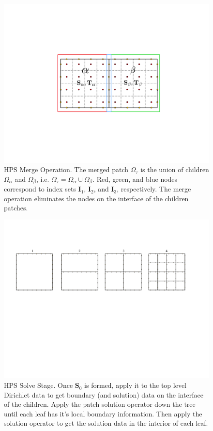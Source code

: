 \begin{figure}
    \centering
    \includegraphics[width=0.7\columnwidth]{figures/merge_figure.pdf}
    \caption{HPS Merge Operation. The merged patch $\Omega_{\tau}$ is the union of children $\Omega_{\alpha}$ and $\Omega_{\beta}$, i.e. $\Omega_{\tau} = \Omega_{\alpha} \cup \Omega_{\beta}$. Red, green, and blue nodes correspond to index sets $\textbf{I}_1$, $\textbf{I}_2$, and $\textbf{I}_3$, respectively. The merge operation eliminates the nodes on the interface of the children patches.}
    \label{fig:merge}
\end{figure}

\begin{figure}
    \centering
    \includegraphics[width=\columnwidth]{figures/solve_figure.pdf}
    \caption{HPS Solve Stage. Once $\textbf{S}_0$ is formed, apply it to the top level Dirichlet data to get boundary (and solution) data on the interface of the children. Apply the patch solution operator down the tree until each leaf has it's local boundary information. Then apply the solution operator to get the solution data in the interior of each leaf.}
    \label{fig:solve}
\end{figure}
